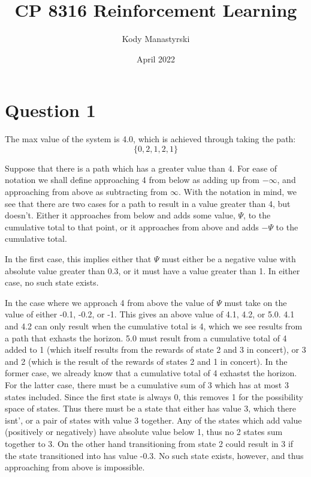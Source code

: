 \documentclass{article}
\author{Kody Manastyrski}
\title{CP 8316 Reinforcement Learning}
\date{April 2022}
\begin{document}
\maketitle

\section{Question 1}
The max value of the system is 4.0, which is achieved through taking the path:
\[\{0, 2, 1, 2, 1\}\]

Suppose that there is a path which has a greater value than 4. 
For ease of notation we shall define approaching 4 from below as adding up from
$-\infty$, and approaching from above as subtracting from $\infty$. 
With the notation in mind, we see that there are two cases for a path to result
in a value greater than 4, but doesn't.
Either it approaches from below and adds some value,
$\Psi$, to the cumulative total to that point, or it approaches from above and
adds $-\Psi$ to the cumulative total.

In the first case, this implies either 
that $\Psi$ must either be a negative value with absolute value greater than 0.3,
or it must have a value greater than 1.
In either case, no such state exists. 

In the case where we approach 4 from above the value of $\Psi$ must take on the
value of either -0.1, -0.2, or -1.
This gives an above value of 4.1, 4.2, or 5.0. 
4.1 and 4.2 can only result when the cumulative total is 4, which we see results from 
a path that exhasts the horizon.
5.0 must result from a cumulative total of 4 added to 1 
(which itself results from the rewards of state 2 and 3 in concert), or 3 and 2 
(which is the result of the rewards of states 2 and 1 in concert).
In the former case, we already know that a cumulative total of 4 exhastst the  horizon.
For the latter case, there must be a cumulative sum of 3 which has at most 3 states included.
Since the first state is always 0, this removes 1 for the possibility space of states.
Thus there must be a state that either has value 3, which there isnt', or a pair of states
with value 3 together. 
Any of the states which add value (positively or negatively) have absolute value below 1, 
thus no 2 states sum together to 3. 
On the other hand transitioning from state 2 could result in 3 if the state transitioned
into has value -0.3. 
No such state exists, however, and thus approaching from above is impossible.
\end{document}
